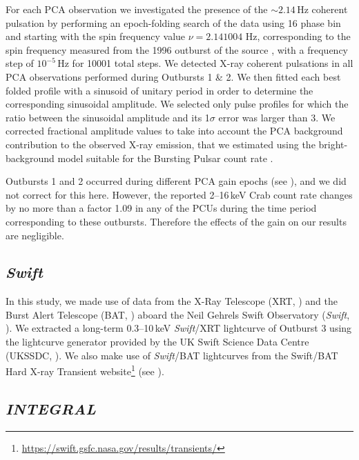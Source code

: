 \par For each PCA observation we investigated the presence of the $\sim 2.14$\,Hz coherent pulsation by performing an epoch-folding search of the data using 16 phase bin and starting with the spin frequency value $\nu=2.141004$ Hz, corresponding to the spin frequency measured from the 1996 outburst of the source \citep{Finger_Pulse}, with a frequency step of $10^{-5}$\,Hz for 10001 total steps. We detected X-ray coherent pulsations in all PCA observations performed during Outbursts 1 \& 2. We then fitted each best folded profile with a sinusoid of unitary period in order to determine the corresponding sinusoidal amplitude. We selected only pulse profiles for which the ratio between the sinusoidal amplitude and its 1$\sigma$ error was larger than 3.  We corrected fractional amplitude values to take into account the PCA background contribution to the observed X-ray emission, that we estimated using the bright-background model suitable for the Bursting Pulsar count rate \citep[see][]{Jahoda_Calibrate}.
\par Outbursts 1 and 2 occurred during different PCA gain epochs (see \citealp{Jahoda_Calibrate}), and we did not correct for this here.  However, the reported 2--16\,keV Crab count rate changes by no more than a factor 1.09 in any of the PCUs during the time period corresponding to these outbursts.  Therefore the effects of the gain on our results are negligible.

\subsection{\textit{Swift}}
\par In this study, we made use of data from the X-Ray Telescope (XRT, \citealp{Burrows_XRT}) and the Burst Alert Telescope (BAT, \citealp{Krimm_BAT}) aboard the Neil Gehrels Swift Observatory (\textit{Swift}, \citealp{Gehrels_Swift}).  We extracted a long-term 0.3--10\,keV \textit{Swift}/XRT lightcurve of Outburst 3 using the lightcurve generator provided by the UK Swift Science Data Centre (UKSSDC, \citealp{Evans_Swift1}).  We also make use of \textit{Swift}/BAT lightcurves from the Swift/BAT Hard X-ray Transient website\footnote{\url{https://swift.gsfc.nasa.gov/results/transients/}} (see \citealp{Krimm_BAT}).

\subsection{\textit{INTEGRAL}}

